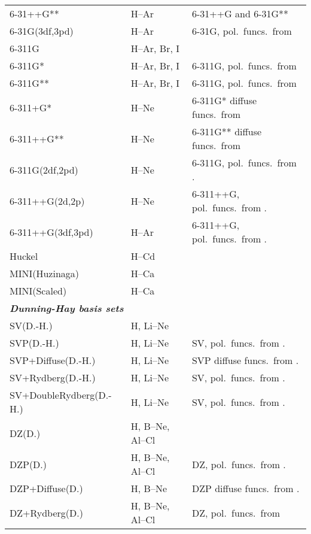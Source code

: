 \begin{longtable}{lll}
6-31++G** & H--Ar & 6-31++G and 6-31G**\\
6-31G(3df,3pd) & H--Ar & 6-31G, pol.\ funcs.\ from
  \cite{mjfjapjsbjcp80}\\
6-311G & H--Ar, Br, I & \cite{rkjsbrsjapjcp72,admgscjcp72,
   lacmpmjpbnedrcblrjcp103,mngapmpmlrjcp103}\\
6-311G* & H--Ar, Br, I & 6-311G, pol.\ funcs.\ from
  \cite{rkjsbrsjapjcp72,lacmpmjpbnedrcblrjcp103}\\
6-311G** & H--Ar, Br, I & 6-311G, pol.\ funcs.\ from
  \cite{rkjsbrsjapjcp72,lacmpmjpbnedrcblrjcp103}\\
6-311+G* & H--Ne & 6-311G* diffuse funcs.\ from 
  \cite{tcjcgwsprsjcc4}\\
6-311++G** & H--Ne & 6-311G** diffuse funcs.\ from
  \cite{tcjcgwsprsjcc4}\\
6-311G(2df,2pd) & H--Ne & 6-311G, pol.\ funcs.\ from
  \cite{mjfjapjsbjcp80}.\\
6-311++G(2d,2p) & H--Ne & 6-311++G, pol.\ funcs.\ from
  \cite{mjfjapjsbjcp80}.\\
6-311++G(3df,3pd) & H--Ar & 6-311++G, pol.\ funcs.\ from
  \cite{mjfjapjsbjcp80}.\\
\hline
%
Huckel & H--Cd & \\
MINI(Huzinaga) & H--Ca & \cite{huzinagabasis} \\
MINI(Scaled) & H--Ca & \cite{huzinagabasis,htshjcc1} \\
\hline
%
\multicolumn{3}{l}{\bf{\emph{Dunning-Hay basis sets}}} \\
SV(D.-H.) & H, Li--Ne & \cite{thdpjhhfs1977} \\
SVP(D.-H.) & H, Li--Ne & SV, pol.\ funcs.\ from
  \cite{thdpjhhfs1977,emhfsjcp83}.\\
SVP+Diffuse(D.-H.) & H, Li--Ne & SVP diffuse funcs.\ from
  \cite{thdpjhhfs1977,emhfsjcp83}.\\
SV+Rydberg(D.-H.) & H, Li--Ne & SV, pol.\ funcs.\ from
  \cite{thdpjhhfs1977-2}.\\
\small{SV+DoubleRydberg(D.-H.)} & H, Li--Ne & SV, pol.\ funcs.\ from
  \cite{thdpjhhfs1977-2}.\\
DZ(D.) & H, B--Ne, Al--Cl & \cite{thdjcp53,thdpjhhfs1977} \\
DZP(D.) & H, B--Ne, Al--Cl & DZ, pol.\ funcs.\ from 
  \cite{thdpjhhfs1977,emhfsjcp83}.\\
DZP+Diffuse(D.) & H, B--Ne & DZP diffuse funcs.\ from
  \cite{thdpjhhfs1977,emhfsjcp83}.\\
DZ+Rydberg(D.) & H, B--Ne, Al--Cl & DZ, pol.\ funcs.\ from

\end{longtable}
